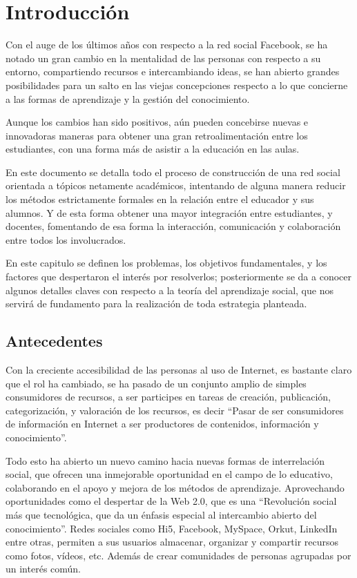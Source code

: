 \chapter{Introducción}

Con el auge de los últimos años con respecto a la red social
Facebook\cite{Jeria}, se ha notado un gran cambio en la mentalidad de las
personas con respecto a su entorno, compartiendo recursos e intercambiando
ideas, se han abierto grandes posibilidades para un salto en las viejas
concepciones respecto a lo que concierne a las formas de aprendizaje y la
gestión del conocimiento.

Aunque los cambios han sido positivos, aún pueden concebirse nuevas e
innovadoras maneras para obtener una gran retroalimentación entre los
estudiantes, con una forma más de asistir a la educación en las aulas.

En este documento se detalla todo el proceso de construcción de una red social
orientada a tópicos netamente académicos, intentando de alguna manera reducir
los métodos estrictamente formales en la relación entre el educador y sus
alumnos. Y de esta forma obtener una mayor integración entre estudiantes, y
docentes, fomentando de esa forma la interacción, comunicación y colaboración
entre todos los involucrados.

En este capitulo se definen los problemas, los objetivos fundamentales, y los
factores que despertaron el interés por resolverlos; posteriormente se da a
conocer algunos detalles claves con respecto a la teoría del aprendizaje
social, que nos servirá de fundamento para la realización de toda estrategia
planteada.

\section{Antecedentes}
Con la creciente accesibilidad de las personas al uso de Internet, es bastante
claro que el rol ha cambiado, se ha pasado de un conjunto amplio de simples
consumidores de recursos, a ser participes en tareas de creación, publicación,
categorización, y valoración de los recursos, es decir “Pasar de ser
consumidores de información en Internet a ser productores de contenidos,
información y conocimiento”\cite{Rodriguez}.

Todo esto ha abierto un nuevo camino hacia nuevas formas de interrelación
social, que ofrecen una inmejorable oportunidad en el campo de lo educativo,
colaborando en el apoyo y mejora de los métodos de aprendizaje. Aprovechando
oportunidades como el despertar de la Web 2.0, que es una “Revolución social
más que tecnológica, que da un énfasis especial al intercambio abierto del
conocimiento”\cite{Rodriguez}. Redes sociales como Hi5, Facebook, MySpace,
Orkut, LinkedIn entre otras, permiten a sus usuarios almacenar, organizar y
compartir recursos como fotos, vídeos, etc. Además de crear comunidades de
personas agrupadas por un interés común.

